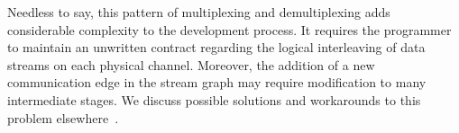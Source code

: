 
Needless to say, this pattern of multiplexing and demultiplexing adds
considerable complexity to the development process.  It requires the
programmer to maintain an unwritten contract regarding the logical
interleaving of data streams on each physical channel.  Moreover, the
addition of a new communication edge in the stream graph may require
modification to many intermediate stages.  We discuss possible
solutions and workarounds to this problem elsewhere~\cite{thies-thesis}.



